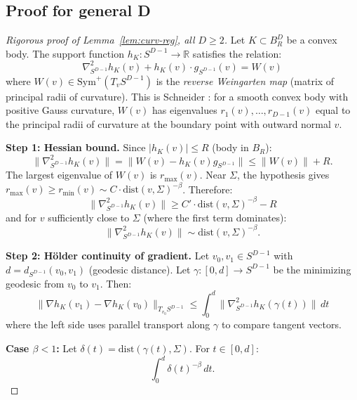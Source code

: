 

\subsection{Proof for general D}

\begin{proof}[Rigorous proof of Lemma~\ref{lem:curv-reg}, all $D \geq 2$]
Let $K \subset B_R^D$ be a convex body. The support function $h_K : S^{D-1} \to \mathbb{R}$ satisfies the relation:
\[
  \nabla^2_{S^{D-1}} h_K(v) + h_K(v) \cdot g_{S^{D-1}}(v) = W(v)
\]
where $W(v) \in \mathrm{Sym}^+(T_v S^{D-1})$ is the \emph{reverse Weingarten map} (matrix of principal radii of curvature). This is Schneider \cite[Theorem 2.5.1]{schneider2014convex}: for a smooth convex body with positive Gauss curvature, $W(v)$ has eigenvalues $r_1(v), \ldots, r_{D-1}(v)$ equal to the principal radii of curvature at the boundary point with outward normal $v$.

\textbf{Step 1: Hessian bound.} Since $|h_K(v)| \leq R$ (body in $B_R$):
\[
  \|\nabla^2_{S^{D-1}} h_K(v)\| = \|W(v) - h_K(v) g_{S^{D-1}}\| \leq \|W(v)\| + R.
\]
The largest eigenvalue of $W(v)$ is $r_{\max}(v)$. Near $\Sigma$, the hypothesis gives $r_{\max}(v) \geq r_{\min}(v) \sim C \cdot \mathrm{dist}(v, \Sigma)^{-\beta}$. Therefore:
\[
  \|\nabla^2_{S^{D-1}} h_K(v)\| \geq C' \cdot \mathrm{dist}(v, \Sigma)^{-\beta} - R
\]
and for $v$ sufficiently close to $\Sigma$ (where the first term dominates):
\[
  \|\nabla^2_{S^{D-1}} h_K(v)\| \sim \mathrm{dist}(v, \Sigma)^{-\beta}.
\]

\textbf{Step 2: H\"older continuity of gradient.} Let $v_0, v_1 \in S^{D-1}$ with $d = d_{S^{D-1}}(v_0, v_1)$ (geodesic distance). Let $\gamma : [0, d] \to S^{D-1}$ be the minimizing geodesic from $v_0$ to $v_1$. Then:
\[
  \|\nabla h_K(v_1) - \nabla h_K(v_0)\|_{T_{v_0}S^{D-1}} \leq \int_0^d \|\nabla^2_{S^{D-1}} h_K(\gamma(t))\| \, dt
\]
where the left side uses parallel transport along $\gamma$ to compare tangent vectors.

\textbf{Case $\beta < 1$:} Let $\delta(t) = \mathrm{dist}(\gamma(t), \Sigma)$. For $t \in [0, d]$:
\[
  \int_0^d \delta(t)^{-\beta} \, dt.
\]


\end{proof}
